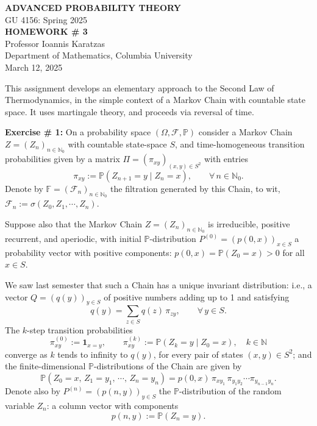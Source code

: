 \begin{center}
    \textbf{ADVANCED PROBABILITY THEORY} \\
    GU 4156: Spring 2025 \\
    \textbf{HOMEWORK \# 3} \\
    Professor Ioannis Karatzas \\
    Department of Mathematics, Columbia University \\
    March 12, 2025
\end{center}

This assignment develops an elementary approach to the Second Law of Thermodynamics, in the simple context of a Markov Chain with countable state space. It uses martingale theory, and proceeds via reversal of time.

\textbf{Exercise \# 1:} On a probability space $(\Omega, \mathcal{F}, \mathbb{P})$ consider a Markov Chain $Z = \left(Z_n\right)_{n \in \mathbb{N}_0}$ with countable state-space $S$, and time-homogeneous transition probabilities given by a matrix $\Pi = \left(\pi_{xy}\right)_{(x,y) \in S^2}$ with entries
\[
    \pi_{xy} := \mathbb{P}(Z_{n+1} = y \mid Z_n = x), \qquad \forall\, n \in \mathbb{N}_0.
\]
Denote by $\mathbb{F} = \left(\mathcal{F}_n\right)_{n \in \mathbb{N}_0}$ the filtration generated by this Chain, to wit, $\mathcal{F}_n := \sigma(Z_0, Z_1, \cdots, Z_n)$.

Suppose also that the Markov Chain $Z = \left(Z_n\right)_{n \in \mathbb{N}_0}$ is irreducible, positive recurrent, and aperiodic, with initial $\mathbb{P}$-distribution $P^{(0)} = \left(p(0,x)\right)_{x \in S}$ a probability vector with positive components: $p(0,x) = \mathbb{P}(Z_0 = x) > 0$ for all $x \in S$.

We saw last semester that such a Chain has a unique invariant distribution: i.e., a vector $Q = \left(q(y)\right)_{y \in S}$ of positive numbers adding up to 1 and satisfying
\begin{equation}
    q(y) = \sum_{z \in S} q(z)\, \pi_{zy}, \qquad \forall\, y \in S.
\end{equation}
The $k$-step transition probabilities
\begin{equation}
    \pi^{(0)}_{xy} := \mathbf{1}_{x=y}, \qquad \pi^{(k)}_{xy} := \mathbb{P}\!\left(Z_k = y \mid Z_0 = x\right), \quad k \in \mathbb{N}
\end{equation}
converge as $k$ tends to infinity to $q(y)$, for every pair of states $(x,y) \in S^2$; and the finite-dimensional $\mathbb{P}$-distributions of the Chain are given by
\begin{equation}
    \mathbb{P}\!\left(Z_0 = x,\, Z_1 = y_1,\, \cdots,\, Z_n = y_n\right) = p(0,x)\, \pi_{xy_1}\, \pi_{y_1 y_2} \cdots \pi_{y_{n-1} y_n}.
\end{equation}
Denote also by $P^{(n)} = \left(p(n,y)\right)_{y \in S}$ the $\mathbb{P}$-distribution of the random variable $Z_n$: a column vector with components
\[
    p(n,y) := \mathbb{P}(Z_n = y).
\]

